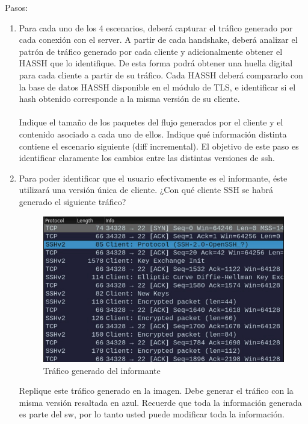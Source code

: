 \documentclass[letter,12pt]{article}
\begin{document}
Pasos:

\begin{enumerate}
\item Para cada uno de los 4 escenarios, deberá capturar el tráfico generado por cada conexión con el server. A partir de cada handshake, deberá analizar el patrón de tráfico generado por cada cliente y adicionalmente obtener el HASSH que lo identifique. De esta forma podrá obtener una huella digital para cada cliente a partir de su tráfico. Cada HASSH deberá compararlo con la base de datos HASSH disponible en el módulo de TLS, e identificar si el hash obtenido corresponde a la misma versión de su cliente.\\\\
Indique el tamaño de los paquetes del flujo generados por el cliente y el contenido asociado a cada uno de ellos. Indique qué información distinta contiene el escenario siguiente (diff incremental). El objetivo de este paso es identificar claramente los cambios entre las distintas versiones de ssh.\\

\newpage

\item Para poder identificar que el usuario efectivamente es el informante, éste utilizará una versión única de cliente. ¿Con qué cliente SSH se habrá generado el siguiente tráfico?

\begin{figure}[ht]
    \centering
    \includegraphics[width=1\linewidth]{Desarrollo/trafico.png}
    \caption{Tráfico generado del informante}
    \label{fig:trafico}
\end{figure}

Replique este tráfico generado en la imagen. Debe generar el tráfico con la misma versión resaltada en azul. Recuerde que toda la información generada es parte del sw, por lo tanto usted puede modificar toda la información.


\end{enumerate}
\end{document}
